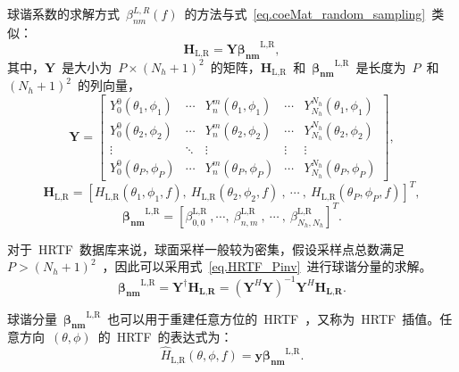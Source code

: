 球谐系数的求解方式~$\beta_{nm}^{L,R}(f)$~的方法与式~\eqref{eq.coeMat_random_sampling}~类似：
\begin{equation}
\bm{H}_{\text{L,R}} = \bm{Y} \bm{\beta_{nm}}^{\text{L,R}},
\end{equation}
其中，$\bm{Y}$~是大小为~$P \times (N_{h}+1)^2$~的矩阵，$\bm{H}_{\text{L,R}}$~和~$\bm{\beta_{nm}}^{\text{L,R}}$~是长度为~$P$~和~$(N_{h}+1)^2$~的列向量，
\begin{equation}
\bm{Y}=\left[
\begin{array}{ccccc}
Y_{0}^{0}\left(\theta_{1}, \phi_{1}\right) & \cdots & Y_{n}^{m}\left(\theta_{1}, \phi_{1}\right) & \cdots & Y_{N_{h}}^{N_{h}}\left(\theta_{1}, \phi_{1}\right) \\
Y_{0}^{0}\left(\theta_{2}, \phi_{2}\right) & \cdots & Y_{n}^{m}\left(\theta_{2}, \phi_{2}\right) & \cdots & Y_{N_{h}}^{N_{h}}\left(\theta_{2}, \phi_{2}\right) \\
\vdots & \ddots & \vdots & \vdots  & \vdots \\
Y_{0}^{0}\left(\theta_{P}, \phi_{P}\right) & \cdots & Y_{n}^{m}\left(\theta_{P}, \phi_{P}\right) & \cdots & Y_{N_{h}}^{N_{h}}\left(\theta_{P}, \phi_{P}\right)
\end{array}\right],
\end{equation}
\begin{equation}
\bm{H}_{\text{L,R}} = [H_{\text{L,R}}(\theta_{1},\phi_{1},f),~H_{\text{L,R}}(\theta_{2},\phi_{2},f)~,~\cdots~,~H_{\text{L,R}}(\theta_{P},\phi_{P},f)]^{T},
\end{equation}
\begin{equation}
\bm{\beta_{nm}}^{\text{L,R}} = [\beta_{0,0}^{\text{L,R}}~,\cdots,~\beta_{n,m}^{\text{L,R}}~,~\cdots~,~\beta_{N_{h},N_{h}}^{\text{L,R}}]^{T}.
\end{equation}


对于~HRTF~数据库来说，球面采样一般较为密集，假设采样点总数满足~$P>(N_{h}+1)^2$~，因此可以采用式~\eqref{eq.HRTF_Pinv}~进行球谐分量的求解。
\begin{equation}\label{eq.HRTF_Pinv}
\bm{\beta_{nm}}^{\text{L,R}} = \bm{Y}^{\dagger}\bm{H_{\text{L,R}}}= (\bm{Y}^{H}\bm{Y})^{-1}\bm{Y}^{H}\bm{H_{\text{L,R}}}.
\end{equation}

球谐分量~$\bm{\beta_{nm}}^{\text{L,R}}$~也可以用于重建任意方位的~HRTF~，又称为~HRTF~插值。任意方向~$(\theta,\phi)$~的~HRTF~的表达式为：
\begin{equation}
\hat{H}_{\text{L,R}}(\theta,\phi,f) = \bm{y} \bm{\beta_{nm}}^{\text{L,R}}.
\end{equation}


